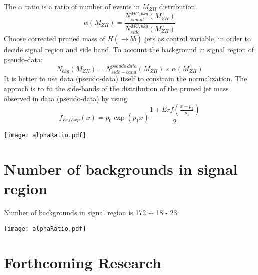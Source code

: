 \documentclass[a0,portrait]{a0poster}
\begin{document}
\begin{multicols}{2}
  The $\alpha$ ratio is a ratio of number of events in $M_{ZH}$ distribution.
  \begin{equation}
    \alpha(M_{ZH}) = \frac{N^{MC,bkg}_{signal}(M_{ZH})}{N^{MC,bkg}_{side}(M_{ZH})}
  \end{equation}
  Choose corrected pruned mass of $H (\rightarrow b\bar{b})$ jets as control variable, in order to decide signal region and side band.
  To account the background in signal region of pseudo-data:
  \begin{equation}
    N_{bkg}(M_{ZH}) = N^{pseudo\ data}_{side-band}(M_{ZH})\times \alpha(M_{ZH})
  \end{equation}
  It is better to use data (pseudo-data) itself to constrain the normalization.
  The approch is to fit the side-bands of the distribution of the pruned jet mass observed in data (pseudo-data) by using
  \begin{equation}
    f_{ErfExp}(x) = p_0\exp(p_1x)\frac{1+Erf(\frac{x-p_2}{p_3})}{2}
  \end{equation}

  \begin{center}
    \texttt{[image: alphaRatio.pdf]}
  \end{center}

  
  \section*{\color{Crimson} Number of backgrounds in signal region}

  Number of backgrounds in signal region is 172 + 18 - 23.

  \begin{center}
    \texttt{[image: alphaRatio.pdf]}
  \end{center}
  

  \section*{\color{Crimson} Forthcoming Research}



\end{multicols}
\end{document}
